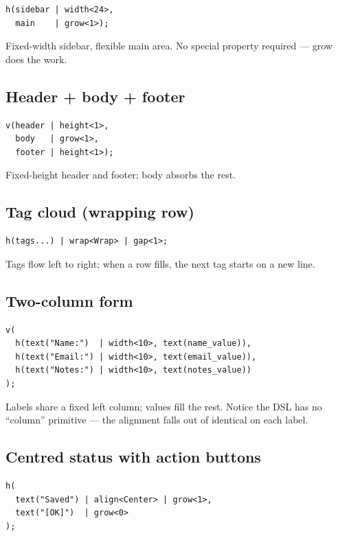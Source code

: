 \begin{lstlisting}
h(sidebar | width<24>,
  main    | grow<1>);
\end{lstlisting}

Fixed-width sidebar, flexible main area. No special property
required --- grow does the work.

\subsection*{Header + body + footer}

\begin{lstlisting}
v(header | height<1>,
  body   | grow<1>,
  footer | height<1>);
\end{lstlisting}

Fixed-height header and footer; body absorbs the rest.

\subsection*{Tag cloud (wrapping row)}

\begin{lstlisting}
h(tags...) | wrap<Wrap> | gap<1>;
\end{lstlisting}

Tags flow left to right; when a row fills, the next tag starts
on a new line.

\subsection*{Two-column form}

\begin{lstlisting}
v(
  h(text("Name:")  | width<10>, text(name_value)),
  h(text("Email:") | width<10>, text(email_value)),
  h(text("Notes:") | width<10>, text(notes_value))
);
\end{lstlisting}

Labels share a fixed left column; values fill the rest. Notice
the DSL has no ``column'' primitive --- the alignment falls out
of identical  on each label.

\subsection*{Centred status with action buttons}

\begin{lstlisting}
h(
  text("Saved") | align<Center> | grow<1>,
  text("[OK]")  | grow<0>
);
\end{lstlisting}


